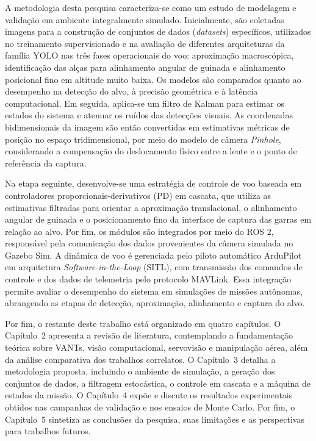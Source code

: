 A metodologia desta pesquisa caracteriza-se como um estudo de modelagem e validação em ambiente integralmente simulado. Inicialmente, são coletadas imagens para a construção de conjuntos de dados (\textit{datasets}) específicos, utilizados no treinamento supervisionado e na avaliação de diferentes arquiteturas da família YOLO nas três fases operacionais do voo: aproximação macroscópica, identificação das alças para alinhamento angular de guinada e alinhamento posicional fino em altitude muito baixa. Os modelos são comparados quanto ao desempenho na detecção do alvo, à precisão geométrica e à latência computacional. Em seguida, aplica-se um filtro de Kalman para estimar os estados do sistema e atenuar os ruídos das detecções visuais. As coordenadas bidimensionais da imagem são então convertidas em estimativas métricas de posição no espaço tridimensional, por meio do modelo de câmera \textit{Pinhole}, considerando a compensação do deslocamento físico entre a lente e o ponto de referência da captura.

Na etapa seguinte, desenvolve-se uma estratégia de controle de voo baseada em controladores proporcionais-derivativos (PD) em cascata, que utiliza as estimativas filtradas para orientar a aproximação translacional, o alinhamento angular de guinada e o posicionamento fino da interface de captura das garras em relação ao alvo. Por fim, os módulos são integrados por meio do ROS 2, responsável pela comunicação dos dados provenientes da câmera simulada no Gazebo Sim. A dinâmica de voo é gerenciada pelo piloto automático ArduPilot em arquitetura \textit{Software-in-the-Loop} (SITL), com transmissão dos comandos de controle e dos dados de telemetria pelo protocolo MAVLink. Essa integração permite avaliar o desempenho do sistema em simulações de missões autônomas, abrangendo as etapas de detecção, aproximação, alinhamento e captura do alvo.

Por fim, o restante deste trabalho está organizado em quatro capítulos. O Capítulo~2 apresenta a revisão de literatura, contemplando a fundamentação teórica sobre VANTs, visão computacional, servovisão e manipulação aérea, além da análise comparativa dos trabalhos correlatos. O Capítulo~3 detalha a metodologia proposta, incluindo o ambiente de simulação, a geração dos conjuntos de dados, a filtragem estocástica, o controle em cascata e a máquina de estados da missão. O Capítulo~4 expõe e discute os resultados experimentais obtidos nas campanhas de validação e nos ensaios de Monte Carlo. Por fim, o Capítulo~5 sintetiza as conclusões da pesquisa, suas limitações e as perspectivas para trabalhos futuros.

